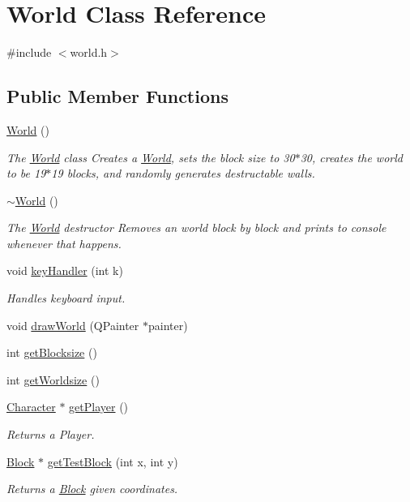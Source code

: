 \hypertarget{class_world}{\section{World Class Reference}
\label{class_world}
}


{\ttfamily \#include $<$world.\-h$>$}

\subsection*{Public Member Functions}
\begin{DoxyCompactItemize}
\item 
\hyperlink{class_world_afa39d4e6f714a7a3691ac0c656f5e8a8}{World} ()
\begin{DoxyCompactList}\small\item\em The \hyperlink{class_world}{World} class Creates a \hyperlink{class_world}{World}, sets the block size to 30$\ast$30, creates the world to be 19$\ast$19 blocks, and randomly generates destructable walls. \end{DoxyCompactList}\item 
\hyperlink{class_world_a8c73fba541a5817fff65147ba47cd827}{$\sim$\-World} ()
\begin{DoxyCompactList}\small\item\em The \hyperlink{class_world}{World} destructor Removes an world block by block and prints to console whenever that happens. \end{DoxyCompactList}\item 
void \hyperlink{class_world_a83f49e35b8f8b33f14198e87b2fa7312}{key\-Handler} (int k)
\begin{DoxyCompactList}\small\item\em Handles keyboard input. \end{DoxyCompactList}\item 
void \hyperlink{class_world_a08d405bfe0cef56b06f731addeb22bcf}{draw\-World} (Q\-Painter $\ast$painter)
\item 
int \hyperlink{class_world_ab44648ec788ea8dfe063a1fce7f86026}{get\-Blocksize} ()
\item 
int \hyperlink{class_world_a43fe0009fa77b79202cd3ef7e8e7af5f}{get\-Worldsize} ()
\item 
\hyperlink{class_character}{Character} $\ast$ \hyperlink{class_world_a66856566fadcf64eba71f5e3ccc790df}{get\-Player} ()
\begin{DoxyCompactList}\small\item\em Returns a Player. \end{DoxyCompactList}\item 
\hyperlink{class_block}{Block} $\ast$ \hyperlink{class_world_a24f0eab80a2a3b6bc983f58fa2adaa55}{get\-Test\-Block} (int x, int y)
\begin{DoxyCompactList}\small\item\em Returns a \hyperlink{class_block}{Block} given coordinates. \end{DoxyCompactList}\end{DoxyCompactItemize}



